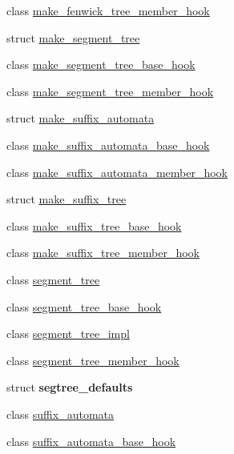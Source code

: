 \begin{DoxyCompactItemize}
\item 
class \hyperlink{classboost_1_1intrusive_1_1make__fenwick__tree__member__hook}{make\+\_\+fenwick\+\_\+tree\+\_\+member\+\_\+hook}
\item 
struct \hyperlink{structboost_1_1intrusive_1_1make__segment__tree}{make\+\_\+segment\+\_\+tree}
\item 
class \hyperlink{classboost_1_1intrusive_1_1make__segment__tree__base__hook}{make\+\_\+segment\+\_\+tree\+\_\+base\+\_\+hook}
\item 
class \hyperlink{classboost_1_1intrusive_1_1make__segment__tree__member__hook}{make\+\_\+segment\+\_\+tree\+\_\+member\+\_\+hook}
\item 
struct \hyperlink{structboost_1_1intrusive_1_1make__suffix__automata}{make\+\_\+suffix\+\_\+automata}
\item 
class \hyperlink{classboost_1_1intrusive_1_1make__suffix__automata__base__hook}{make\+\_\+suffix\+\_\+automata\+\_\+base\+\_\+hook}
\item 
class \hyperlink{classboost_1_1intrusive_1_1make__suffix__automata__member__hook}{make\+\_\+suffix\+\_\+automata\+\_\+member\+\_\+hook}
\item 
struct \hyperlink{structboost_1_1intrusive_1_1make__suffix__tree}{make\+\_\+suffix\+\_\+tree}
\item 
class \hyperlink{classboost_1_1intrusive_1_1make__suffix__tree__base__hook}{make\+\_\+suffix\+\_\+tree\+\_\+base\+\_\+hook}
\item 
class \hyperlink{classboost_1_1intrusive_1_1make__suffix__tree__member__hook}{make\+\_\+suffix\+\_\+tree\+\_\+member\+\_\+hook}
\item 
class \hyperlink{classboost_1_1intrusive_1_1segment__tree}{segment\+\_\+tree}
\item 
class \hyperlink{classboost_1_1intrusive_1_1segment__tree__base__hook}{segment\+\_\+tree\+\_\+base\+\_\+hook}
\item 
class \hyperlink{classboost_1_1intrusive_1_1segment__tree__impl}{segment\+\_\+tree\+\_\+impl}
\item 
class \hyperlink{classboost_1_1intrusive_1_1segment__tree__member__hook}{segment\+\_\+tree\+\_\+member\+\_\+hook}
\item 
struct {\bfseries segtree\+\_\+defaults}
\item 
class \hyperlink{classboost_1_1intrusive_1_1suffix__automata}{suffix\+\_\+automata}
\item 
class \hyperlink{classboost_1_1intrusive_1_1suffix__automata__base__hook}{suffix\+\_\+automata\+\_\+base\+\_\+hook}

\end{DoxyCompactItemize}
